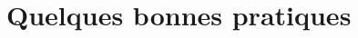 \documentclass[8pt,xcolor=pdftex,table]{beamer}
\def\arraystretch{.1}%
\begin{document}

	




\section{Quelques bonnes pratiques}
\end{document}
